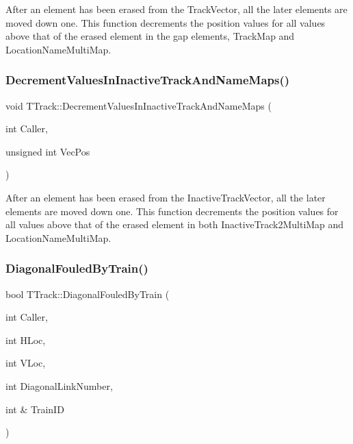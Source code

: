 After an element has been erased from the Track\+Vector, all the later elements are moved down one. This function decrements the position values for all values above that of the erased element in the gap elements, Track\+Map and Location\+Name\+Multi\+Map. \mbox{\label{class_t_track_af8f925ac5e7301c1094cec76808e1140}} 
\subsubsection{\texorpdfstring{Decrement\+Values\+In\+Inactive\+Track\+And\+Name\+Maps()}{DecrementValuesInInactiveTrackAndNameMaps()}}
{\footnotesize\ttfamily void T\+Track\+::\+Decrement\+Values\+In\+Inactive\+Track\+And\+Name\+Maps (\begin{DoxyParamCaption}\item[{int}]{Caller,  }\item[{unsigned int}]{Vec\+Pos }\end{DoxyParamCaption})}

After an element has been erased from the Inactive\+Track\+Vector, all the later elements are moved down one. This function decrements the position values for all values above that of the erased element in both Inactive\+Track2\+Multi\+Map and Location\+Name\+Multi\+Map. \mbox{\label{class_t_track_a3b4a2e8a16c61a4286fcf34adb000819}} 
\subsubsection{\texorpdfstring{Diagonal\+Fouled\+By\+Train()}{DiagonalFouledByTrain()}}
{\footnotesize\ttfamily bool T\+Track\+::\+Diagonal\+Fouled\+By\+Train (\begin{DoxyParamCaption}\item[{int}]{Caller,  }\item[{int}]{H\+Loc,  }\item[{int}]{V\+Loc,  }\item[{int}]{Diagonal\+Link\+Number,  }\item[{int \&}]{Train\+ID }\end{DoxyParamCaption})}


